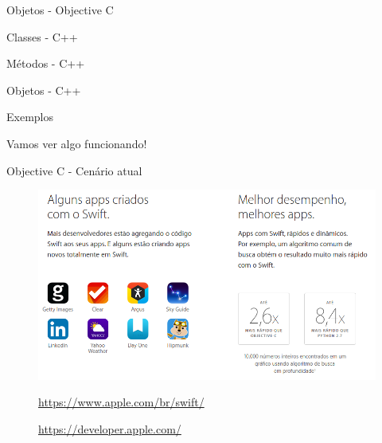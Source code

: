 \documentclass[compress]{beamer}
\begin{document}
\begin{frame}{Objetos - Objective C}
    \begingroup
        \ttfamily
        
    \endgroup
\end{frame}

\begin{frame}{Classes - C++}
    \begingroup
        \ttfamily
        
    \endgroup
\end{frame}

\begin{frame}{Métodos - C++}
    \begingroup
        \ttfamily
        
    \endgroup
  
\end{frame}

\begin{frame}{Objetos - C++}
    \begingroup
        \ttfamily
        
    \endgroup
\end{frame}

\begin{frame}{Exemplos}
    \begin{center}
    \huge{Vamos ver algo funcionando!}
    \end{center}
\end{frame}

\begin{frame}{Objective C - Cenário atual}
  \begin{figure}[h!]
    \centering
    \includegraphics[width=1\textwidth]{Apple.png}
    \caption{\small \url{https://www.apple.com/br/swift/}}
    \caption{\small \url{https://developer.apple.com/}}
  \end{figure}
\end{frame}
\end{document}
